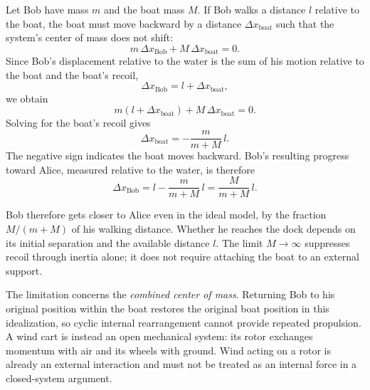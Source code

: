 \documentclass[reprint,aps,pra,longbibliography]{revtex4-2}
\begin{document}
Let Bob have mass $m$ and the boat mass $M$. If Bob walks a distance $l$ relative to the boat, the boat must move backward by a distance $\Delta x_\text{boat}$ such that the system's center of mass does not shift:
\begin{equation}
m\,\Delta x_\text{Bob} + M\,\Delta x_\text{boat} = 0.
\end{equation}
Since Bob's displacement relative to the water is the sum of his motion relative to the boat and the boat's recoil,
\begin{equation}
\Delta x_\text{Bob} = l + \Delta x_\text{boat},
\end{equation}
we obtain
\begin{equation}
m(l + \Delta x_\text{boat}) + M\,\Delta x_\text{boat} = 0.
\end{equation}
Solving for the boat's recoil gives
\begin{equation}
\Delta x_\text{boat} = -\frac{m}{m+M}\,l.
\end{equation}
The negative sign indicates the boat moves backward. Bob's resulting progress toward Alice, measured relative to the water, is therefore
\begin{equation}
\Delta x_\text{Bob} = l - \frac{m}{m+M}\,l = \frac{M}{m+M}\,l.
\end{equation}

Bob therefore gets closer to Alice even in the ideal model, by the fraction \(M/(m+M)\) of his walking distance. Whether he reaches the dock depends on its initial separation and the available distance \(l\). The limit \(M\to\infty\) suppresses recoil through inertia alone; it does not require attaching the boat to an external support.

The limitation concerns the \emph{combined center of mass}. Returning Bob to his original position within the boat restores the original boat position in this idealization, so cyclic internal rearrangement cannot provide repeated propulsion. A wind cart is instead an open mechanical system: its rotor exchanges momentum with air and its wheels with ground. Wind acting on a rotor is already an external interaction and must not be treated as an internal force in a closed-system argument.
\end{document}
